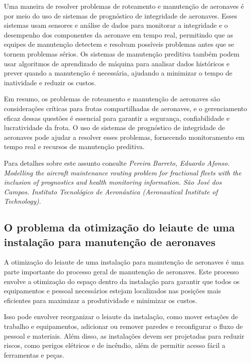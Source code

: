\documentclass{article}
\begin{document}
Uma maneira de resolver problemas de roteamento e manutenção de aeronaves é por meio do uso de sistemas de prognóstico de integridade de aeronaves. Esses sistemas usam sensores e análise de dados para monitorar a integridade e o desempenho dos componentes da aeronave em tempo real, permitindo que as equipes de manutenção detectem e resolvam possíveis problemas antes que se tornem problemas sérios. Os sistemas de manutenção preditiva também podem usar algoritmos de aprendizado de máquina para analisar dados históricos e prever quando a manutenção é necessária, ajudando a minimizar o tempo de inatividade e reduzir os custos.

Em resumo, os problemas de roteamento e manutenção de aeronaves são considerações críticas para frotas compartilhadas de aeronaves, e o gerenciamento eficaz dessas questões é essencial para garantir a segurança, confiabilidade e lucratividade da frota. O uso de sistemas de prognóstico de integridade de aeronaves pode ajudar a resolver esses problemas, fornecendo monitoramento em tempo real e recursos de manutenção preditiva.

Para detalhes sobre este assunto consulte {\it Pereira Barreto, Eduardo Afonso. Modelling the aircraft maintenance routing problem for fractional fleets with the inclusion of prognostics and health monitoring information. São José dos Campos. Instituto Tecnológico de Aeronáutica (Aeronautical Institute of Technology).}



\subsection{O problema da otimização do leiaute de uma instalação para manutenção de aeronaves}

A otimização do leiaute de uma instalação para manutenção de aeronaves é uma parte importante do processo geral de manutenção de aeronaves. Este processo envolve a otimização do espaço dentro da instalação para garantir que todos os equipamentos e pessoal necessários estejam localizados nas posições mais eficientes para maximizar a produtividade e minimizar os custos.

Isso pode envolver reorganizar o leiaute da instalação, como mover estações de trabalho e equipamentos, adicionar ou remover paredes e reconfigurar o fluxo de pessoal e materiais. Além disso, as instalações devem ser projetadas para reduzir riscos, como perigos elétricos e de incêndio, além de permitir acesso fácil a ferramentas e peças.
\end{document}
